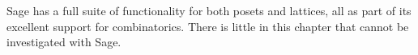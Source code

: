 Sage has a full suite of functionality for both posets and lattices, all as part of its excellent support for combinatorics.  There is little in this chapter that cannot be investigated with Sage.